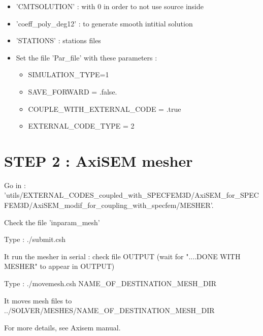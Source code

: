 \documentclass[11pt]{article}
\begin{document}
\begin{itemize}

\item[\textbullet] 'CMTSOLUTION'  : with 0 in order to not use source inside

\item[\textbullet] 'coeff\_poly\_deg12' : to generate smooth intitial solution

\item[\textbullet] 'STATIONS'  : stations files

\item[\textbullet] Set the file 'Par\_file' with these parameters :

\begin{itemize}
\item[\textbullet] SIMULATION\_TYPE=1
\item[\textbullet] SAVE\_FORWARD = .false.
\item[\textbullet] COUPLE\_WITH\_EXTERNAL\_CODE = .true
\item[\textbullet] EXTERNAL\_CODE\_TYPE    = 2
\end{itemize}

\end{itemize}


\section{STEP 2 : AxiSEM mesher}

\noindent Go in  : {\scriptsize  'utils/EXTERNAL\_CODES\_coupled\_with\_SPECFEM3D/AxiSEM\_for\_SPECFEM3D/AxiSEM\_modif\_for\_coupling\_with\_specfem/MESHER'}.

\medskip

\noindent Check the file 'inparam\_mesh'

\medskip

\noindent Type : ./submit.csh

\medskip

\noindent It run the mesher in serial : check file OUTPUT (wait for "....DONE WITH MESHER" to appear in OUTPUT)

\medskip

\noindent Type : ./movemesh.csh NAME\_OF\_DESTINATION\_MESH\_DIR

\medskip

\noindent It moves mesh files to ../SOLVER/MESHES/NAME\_OF\_DESTINATION\_MESH\_DIR

\medskip

\noindent For more details, see Axisem manual.
\end{document}
